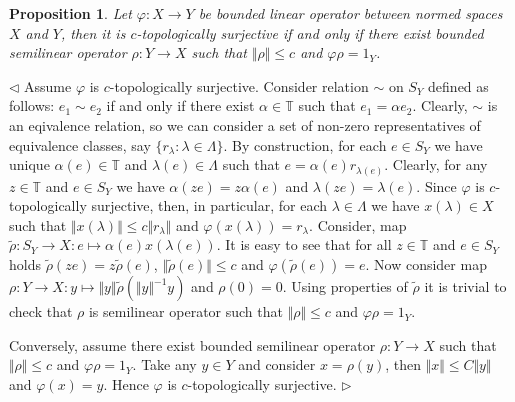 \documentclass[12pt]{article}
\newtheorem{proposition}[theorem]{Proposition}
\newenvironment{proof}{\par $\triangleleft$}{$\triangleright$}
\begin{document}
\begin{proposition}\label{PrCTopSurIsRetrInNor0} Let $\varphi:X\to Y$ be 
bounded linear operator between normed spaces $X$ and $Y$, then it is 
$c$-topologically surjective if and only if there exist bounded semilinear 
operator $\rho:Y\to X$ such that $\Vert\rho\Vert\leq c$ and $\varphi\rho=1_Y$.
\end{proposition}
\begin{proof} Assume $\varphi$ is $c$-topologically surjective. 
Consider relation $\sim$ on $S_Y$ defined as follows: $e_1\sim e_2$  if and 
only if  there exist $\alpha\in\mathbb{T}$ such that $e_1=\alpha e_2$. 
Clearly, $\sim$ is an eqivalence relation, so we can consider a set of 
non-zero representatives of equivalence classes, 
say $ \{r_\lambda:\lambda\in\Lambda \}$. By construction, for 
each $e\in S_Y$ we have unique $\alpha(e)\in\mathbb{T}$ 
and $\lambda(e)\in\Lambda$ such that $e=\alpha(e)r_{\lambda(e)}$. Clearly, 
for any $z\in\mathbb{T}$ and $e\in S_Y$ we have $\alpha(ze)=z\alpha(e)$ 
and $\lambda(ze)=\lambda(e)$. Since $\varphi$ is $c$-topologically surjective, 
then, in particular, for each $\lambda\in\Lambda$ we have $x(\lambda)\in X$ 
such that $\Vert x(\lambda)\Vert\leq c\Vert r_\lambda\Vert$ 
and $\varphi(x(\lambda))=r_\lambda$. Consider, 
map $\tilde{\rho}:S_Y\to X:e\mapsto \alpha(e)x(\lambda(e))$. It is easy to see 
that for all $z\in\mathbb{T}$ and $e\in S_Y$ 
holds $\tilde{\rho}(z e)=z\tilde{\rho}(e)$, $\Vert\tilde{\rho}(e)\Vert\leq c$ 
and $\varphi(\tilde{\rho}(e))=e$. Now consider 
map $\rho:Y\to X: y\mapsto \Vert y\Vert\tilde{\rho}(\Vert y\Vert^{-1} y)$ 
and $\rho(0)=0$. Using properties of $\tilde{\rho}$ it is trivial to check 
that $\rho$ is semilinear operator such that $\Vert\rho\Vert\leq c$ 
and $\varphi\rho=1_Y$.

Conversely, assume there exist bounded semilinear operator $\rho:Y\to X$ such 
that $\Vert\rho\Vert\leq c$ and $\varphi\rho=1_Y$. Take any $y\in Y$ and 
consider $x=\rho(y)$, then $\Vert x\Vert\leq C\Vert y\Vert$ 
and $\varphi(x)=y$. Hence $\varphi$ is $c$-topologically surjective.
\end{proof}
\end{document}
